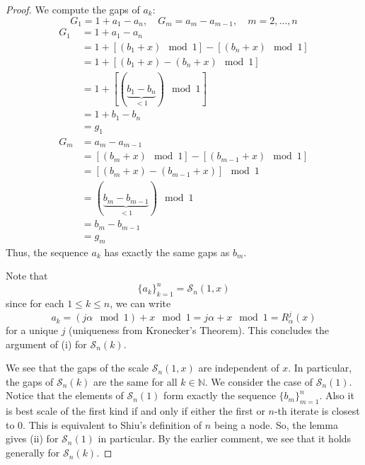 \documentclass[12pt, reqno]{amsart}
\theoremstyle{definition}
\theoremstyle{remark}
\begin{document}
\begin{itemize}
\begin{itemize}
\begin{proof}
\vspace*{10 pt}

We compute the gaps of $a_{k}$: $$G_{1}=1+a_{1}-a_{n},\quad G_{m}=a_{m}-a_{m-1},\quad m=2,\ldots,n$$
\begin{align*}
G_{1}&= 1+a_{1}-a_{n}\\
&= 1+[(b_{1}+x)\mod1]-[(b_{n}+x)\mod1]\\
&= 1+[(b_{1}+x)-(b_{n}+x)\mod1]\\
&= 1+[(\underbrace{b_{1}-b_{n}}_{<1})\mod1]\\
&= 1+b_{1}-b_{n}\\
&= g_{1}\\
G_{m}&=a_{m}-a_{m-1}\\
&= [(b_{m}+x)\mod1]-[(b_{m-1}+x)\mod1]\\
&= [(b_{m}+x)-(b_{m-1}+x)]\mod1\\
&= (\underbrace{b_{m}-b_{m-1}}_{<1})\mod1\\
&= b_{m}-b_{m-1}\\
&= g_{m}
\end{align*}
Thus, the sequence $a_{k}$ has exactly the same gaps as $b_{m}$. 

Note that $$\{a_{k}\}_{k=1}^{n}=\mathcal{S}_{n}(1,x)$$
since for each $1\le k\le n$, we can write $$a_{k}=(j \alpha\mod1)+x\mod1=j \alpha+x\mod 1= R^{j}_{\alpha}(x)$$for a unique $j$ (uniqueness from Kronecker's Theorem). This concludes the argument of (i) for $\mathcal{S}_{n}(k)$.

\vspace*{10 pt}

We see that the gaps of the scale $\mathcal{S}_{n}(1,x)$ are independent of $x$. In particular, the gaps of $\mathcal{S}_{n}(k)$ are the same for all $k\in \mathbb{N}$. We consider the case of $\mathcal{S}_{n}(1)$. Notice that the elements of $\mathcal{S}_{n}(1)$ form exactly the sequence $\{b_{m}\}_{m=1}^{n}$. Also it is best scale of the first kind if and only if either the first or $n$-th iterate is closest to 0. This is equivalent to Shiu's definition of $n$ being a node. So, the lemma gives (ii) for $\mathcal{S}_{n}(1)$ in particular. By the earlier comment, we see that it holds generally for $\mathcal{S}_{n}(k)$.     
\end{proof}



\end{itemize}

\end{itemize}
\end{document}
